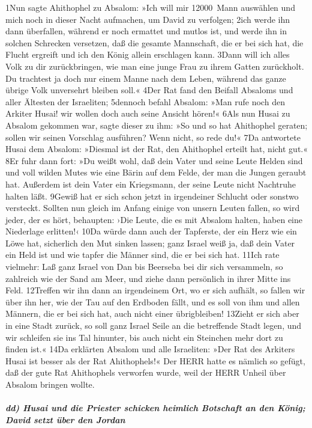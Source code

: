 1Nun sagte Ahithophel zu Absalom: »Ich will mir 12000~Mann auswählen und
mich noch in dieser Nacht aufmachen, um David zu verfolgen; 2ich werde
ihn dann überfallen, während er noch ermattet und mutlos ist, und werde
ihn in solchen Schrecken versetzen, daß die gesamte Mannschaft, die er
bei sich hat, die Flucht ergreift und ich den König allein erschlagen
kann. 3Dann will ich alles Volk zu dir zurückbringen, wie man eine junge
Frau zu ihrem Gatten zurückholt. Du trachtest ja doch nur einem Manne
nach dem Leben, während das ganze übrige Volk unversehrt bleiben soll.«
4Der Rat fand den Beifall Absaloms und aller Ältesten der Israeliten;
5dennoch befahl Absalom: »Man rufe noch den Arkiter Husai! wir wollen
doch auch seine Ansicht hören!« 6Als nun Husai zu Absalom gekommen war,
sagte dieser zu ihm: »So und so hat Ahithophel geraten; sollen wir
seinen Vorschlag ausführen? Wenn nicht, so rede du!« 7Da antwortete
Husai dem Absalom: »Diesmal ist der Rat, den Ahithophel erteilt hat,
nicht gut.« 8Er fuhr dann fort: »Du weißt wohl, daß dein Vater und seine
Leute Helden sind und voll wilden Mutes wie eine Bärin auf dem Felde,
der man die Jungen geraubt hat. Außerdem ist dein Vater ein Kriegsmann,
der seine Leute nicht Nachtruhe halten läßt. 9Gewiß hat er sich schon
jetzt in irgendeiner Schlucht oder sonstwo versteckt. Sollten nun gleich
im Anfang einige von unsern Leuten fallen, so wird jeder, der es hört,
behaupten: ›Die Leute, die es mit Absalom halten, haben eine Niederlage
erlitten!‹ 10Da würde dann auch der Tapferste, der ein Herz wie ein Löwe
hat, sicherlich den Mut sinken lassen; ganz Israel weiß ja, daß dein
Vater ein Held ist und wie tapfer die Männer sind, die er bei sich hat.
11Ich rate vielmehr: Laß ganz Israel von Dan bis Beerseba bei dir sich
versammeln, so zahlreich wie der Sand am Meer, und ziehe dann persönlich
in ihrer Mitte ins Feld. 12Treffen wir ihn dann an irgendeinem Ort, wo
er sich aufhält, so fallen wir über ihn her, wie der Tau auf den
Erdboden fällt, und es soll von ihm und allen Männern, die er bei sich
hat, auch nicht einer übrigbleiben! 13Zieht er sich aber in eine Stadt
zurück, so soll ganz Israel Seile an die betreffende Stadt legen, und
wir schleifen sie ins Tal hinunter, bis auch nicht ein Steinchen mehr
dort zu finden ist.« 14Da erklärten Absalom und alle Israeliten: »Der
Rat des Arkiters Husai ist besser als der Rat Ahithophels!« Der HERR
hatte es nämlich so gefügt, daß der gute Rat Ahithophels verworfen
wurde, weil der HERR Unheil über Absalom bringen wollte.

\hypertarget{dd-husai-und-die-priester-schicken-heimlich-botschaft-an-den-kuxf6nig-david-setzt-uxfcber-den-jordan}{%
\subparagraph{dd) Husai und die Priester schicken heimlich Botschaft an
den König; David setzt über den
Jordan}\label{dd-husai-und-die-priester-schicken-heimlich-botschaft-an-den-kuxf6nig-david-setzt-uxfcber-den-jordan}}

